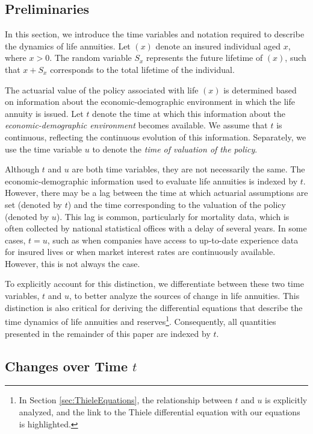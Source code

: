 \documentclass[12pt]{article}
\begin{document}
\subsection{Preliminaries}\label{preliminaries}

In this section, we introduce the time variables and notation required to describe the dynamics of life annuities. Let $(x)$ denote an insured individual aged $x$, where $x > 0$. The random variable \( S_x \) represents the future lifetime of $(x)$, such that \( x + S_x \) corresponds to the total lifetime of the individual. 

The actuarial value of the policy associated with life $(x)$ is determined based on information about the economic-demographic environment in which the life annuity is issued. Let \(t\) denote the  time at which this information about the \textit{economic-demographic environment} becomes available. We assume that \(t\) is continuous, reflecting the continuous evolution of this information. Separately, we use  the time variable \(u\) to denote the \textit{time of valuation of the policy}.

Although \( t \) and \( u \) are both time variables, they are not necessarily the same. The economic-demographic information used to evaluate life annuities is indexed by \( t \). However, there may be a lag between the time at which actuarial assumptions are set (denoted by \( t \)) and the time corresponding to the valuation of the policy (denoted by \( u \)). This lag is common, particularly for mortality data, which is often collected by national statistical offices with a delay of several years. In some cases, \( t = u \), such as when companies have access to up-to-date experience data for insured lives or when market interest rates are continuously available. However, this is not always the case.

To explicitly account for this distinction, we differentiate between these two time variables, \( t \) and \( u \), to better analyze the sources of change in life annuities. This distinction is also critical for deriving the differential equations that describe the time dynamics of life annuities and reserves\footnote{In Section \ref{sec:ThieleEquations}, the relationship between \( t \) and \( u \) is explicitly analyzed, and the link to the Thiele differential equation with our equations is highlighted.}. Consequently, all quantities presented in the remainder of this paper are indexed by \( t \).


\subsection{Changes over Time $t$}
\end{document}
